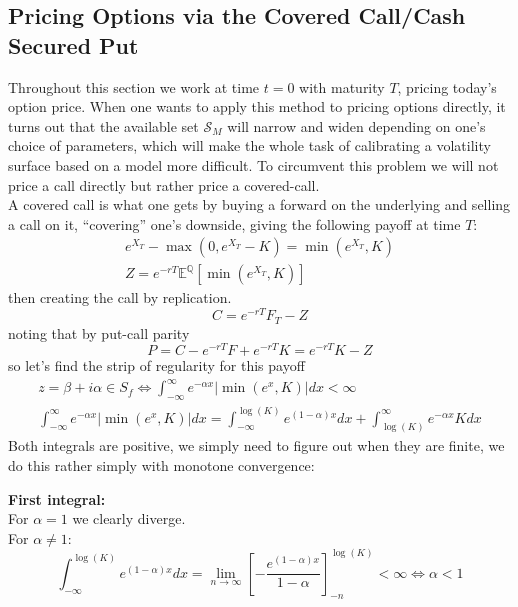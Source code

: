 \subsection{Pricing Options via the Covered Call/Cash Secured Put}
Throughout this section we work at time $t=0$ with maturity $T$, pricing today's option price.
When one wants to apply this method to pricing options directly, it turns out that the available set $\mathcal{S}_M$ will narrow and widen depending
on one's choice of parameters, which will make the whole task of calibrating a volatility surface based on a model more difficult.
To circumvent this problem we will not price a call directly but rather price a covered-call.\\
A covered call is what one gets by buying a forward on the underlying and selling a call on it, ``covering'' one's downside, giving the following payoff at time $T$:
\begin{align}
e^{X_T}-\max(0,e^{X_T}-K)=\min(e^{X_T},K) \\
Z = e^{-rT}\mathbb{E}^{\mathbb{Q}}[\min(e^{X_T},K)]
\end{align}
then creating the call by replication.
\begin{equation}C = e^{-rT}F_T-Z
\end{equation}
noting that by put-call parity
\begin{equation}P = C-e^{-rT}F +e^{-rT}K = e^{-rT}K-Z
\end{equation}
so let's find the strip of regularity for this payoff
\begin{align}
    z= \beta+i \alpha \in S_f \Leftrightarrow \int_{-\infty}^{\infty}e^{-\alpha x}|\min(e^{x},K)|dx<\infty\\
\int_{-\infty}^{\infty}e^{-\alpha x}|\min(e^{x},K)|dx = \int_{-\infty}^{\log(K)}e^{(1-\alpha) x} dx+\int_{\log(K)}^{\infty}e^{-\alpha x}K dx
\end{align}
Both integrals are positive, we simply need to figure out when they are finite, we do this rather simply with monotone convergence:

\textbf{First integral:}\\
For $\alpha =1$ we clearly diverge.\\
For $\alpha \neq 1$:
\begin{equation}\int_{-\infty}^{\log(K)}e^{(1-\alpha) x} dx= \lim_{n\to \infty}[-\frac{e^{(1-\alpha) x}}{1-\alpha}]^{\log(K)}_{-n}<\infty \Leftrightarrow \alpha<1
\end{equation}

